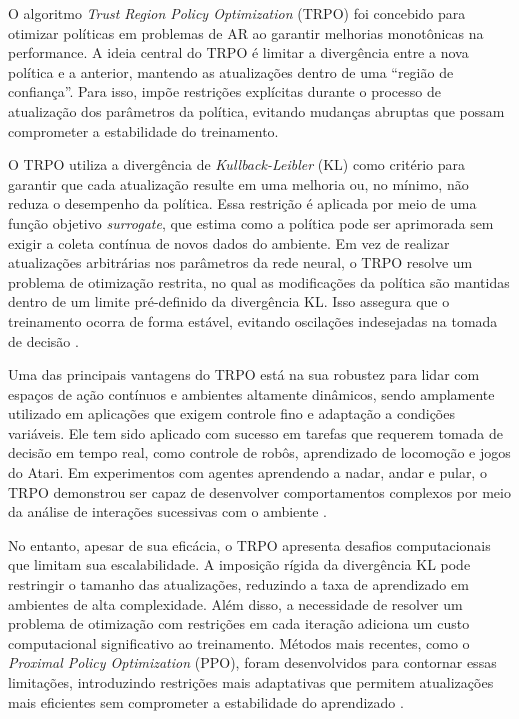 \documentclass[
    12pt,                %
    openright,           %
    oneside,             %
    a4paper,             %
    english,             %
    spanish,             %
    brazil               %
]{ufscar}
\begin{document}
O algoritmo \textit{Trust Region Policy Optimization} (TRPO) foi concebido para otimizar políticas em problemas de AR ao garantir melhorias monotônicas na performance. A ideia central do TRPO é limitar a divergência entre a nova política e a anterior, mantendo as atualizações dentro de uma ``região de confiança''. Para isso, impõe restrições explícitas durante o processo de atualização dos parâmetros da política, evitando mudanças abruptas que possam comprometer a estabilidade do treinamento.

O TRPO utiliza a divergência de \textit{Kullback-Leibler} (KL) como critério para garantir que cada atualização resulte em uma melhoria ou, no mínimo, não reduza o desempenho da política. Essa restrição é aplicada por meio de uma função objetivo \textit{surrogate}, que estima como a política pode ser aprimorada sem exigir a coleta contínua de novos dados do ambiente. Em vez de realizar atualizações arbitrárias nos parâmetros da rede neural, o TRPO resolve um problema de otimização restrita, no qual as modificações da política são mantidas dentro de um limite pré-definido da divergência KL. Isso assegura que o treinamento ocorra de forma estável, evitando oscilações indesejadas na tomada de decisão \cite{schulman_trust_2015}.

Uma das principais vantagens do TRPO está na sua robustez para lidar com espaços de ação contínuos e ambientes altamente dinâmicos, sendo amplamente utilizado em aplicações que exigem controle fino e adaptação a condições variáveis. Ele tem sido aplicado com sucesso em tarefas que requerem tomada de decisão em tempo real, como controle de robôs, aprendizado de locomoção e jogos do Atari. Em experimentos com agentes aprendendo a nadar, andar e pular, o TRPO demonstrou ser capaz de desenvolver comportamentos complexos por meio da análise de interações sucessivas com o ambiente \cite{schulman_trust_2015}.

No entanto, apesar de sua eficácia, o TRPO apresenta desafios computacionais que limitam sua escalabilidade. A imposição rígida da divergência KL pode restringir o tamanho das atualizações, reduzindo a taxa de aprendizado em ambientes de alta complexidade. Além disso, a necessidade de resolver um problema de otimização com restrições em cada iteração adiciona um custo computacional significativo ao treinamento. Métodos mais recentes, como o \textit{Proximal Policy Optimization} (PPO), foram desenvolvidos para contornar essas limitações, introduzindo restrições mais adaptativas que permitem atualizações mais eficientes sem comprometer a estabilidade do aprendizado \cite{schulman_proximal_2017}.
\end{document}
